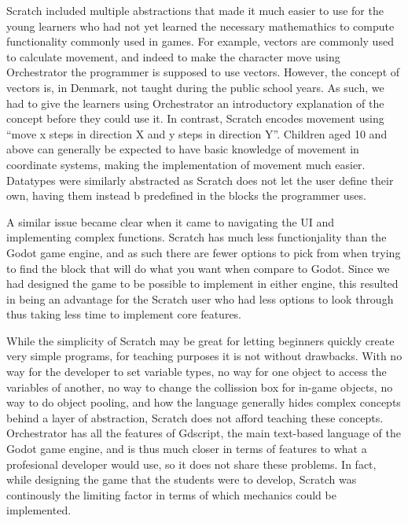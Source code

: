 Scratch included multiple abstractions that made it
much easier to use for the young learners who had not yet learned the
necessary mathemathics to compute functionality commonly used in
games.
For example, vectors are commonly used to calculate movement,
and indeed to make the character move using Orchestrator the
programmer is supposed to use vectors.
However, the concept of
vectors is, in Denmark, not taught during the public school years.
As
such, we had to give the learners using Orchestrator an introductory
explanation of the concept before they could use it.
In contrast,
Scratch encodes movement using “move x steps in direction X and y
steps in direction Y”. Children aged 10 and above can generally be
expected to have basic knowledge of movement in coordinate systems,
making the implementation of movement much easier.
Datatypes were
similarly abstracted as Scratch does not let the user define their
own, having them instead b predefined in the blocks the programmer
uses.

A similar issue became clear when it came to navigating the UI and
implementing complex functions.
Scratch has much less functionjality
than the Godot game engine, and as such there are fewer options to
pick from when trying to find the block that will do what you want
when compare to Godot.
Since we had designed the game to be possible
to implement in either engine, this resulted in being an advantage
for the Scratch user who had less options to look through thus taking
less time to implement core features.

While the simplicity of Scratch may be great for letting beginners
quickly create very simple programs, for teaching purposes it is not
without drawbacks.
With no way for the developer to set variable
types, no way for one object to access the variables of another, no
way to change the collission box for in-game objects, no way to do
object pooling, and how the language generally hides complex concepts
behind a layer of abstraction, Scratch does not afford teaching these
concepts.
Orchestrator has all the features of Gdscript, the main
text-based language of the Godot game engine, and is thus much closer
in terms of features to what a profesional developer would use, so it
does not share these problems.
In fact, while designing the game that
the students were to develop, Scratch was continously the limiting
factor in terms of which mechanics could be implemented.



